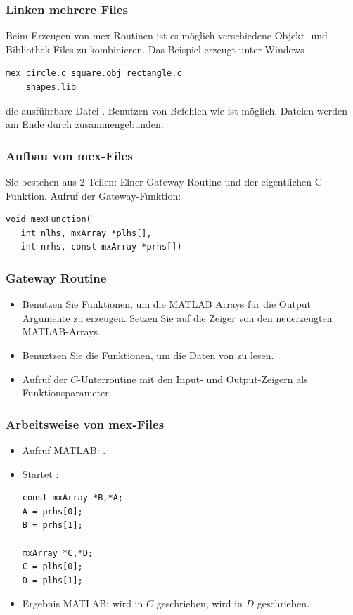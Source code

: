 %
\begin{frame}[fragile]\frametitle{Linken mehrere Files}
Beim Erzeugen von mex-Routinen ist es m\"oglich verschiedene Objekt- und
Bibliothek-Files zu kombinieren. Das Beispiel erzeugt unter Windows
\begin{lstlisting}
mex circle.c square.obj rectangle.c 
    shapes.lib
\end{lstlisting}
die ausf\"uhrbare Datei . Benutzen von Befehlen wie 
ist m\"oglich. Dateien werden am Ende durch  zusammengebunden. 
\end{frame}
%
%
\begin{frame}[fragile]\frametitle{Aufbau von mex-Files}
Sie bestehen aus 2 Teilen: Einer Gateway Routine und der eigentlichen
C-Funktion. Aufruf der Gateway-Funktion:
\begin{lstlisting}
void mexFunction(
   int nlhs, mxArray *plhs[],
   int nrhs, const mxArray *prhs[])
\end{lstlisting}

\end{frame}
%
%
\begin{frame}[fragile]\frametitle{Gateway Routine}

\begin{itemize}
\item Benutzen Sie   Funktionen, um die MATLAB Arrays f\"ur die Output
  Argumente zu erzeugen. Setzen Sie  auf die Zeiger von
  den neuerzeugten MATLAB-Arrays.
\item Benuztzen Sie die  Funktionen, um die Daten von
   zu lesen.
\item Aufruf der $C$-Unterroutine mit den Input- und Output-Zeigern als
  Funktionsparameter. 
\end{itemize}
\end{frame}
%
%
\begin{frame}[fragile]\frametitle{Arbeitsweise von mex-Files}
\begin{itemize}
\item Aufruf MATLAB: \alert{ }.
\item Startet :
\begin{lstlisting}
const mxArray *B,*A;
A = prhs[0];
B = prhs[1];

mxArray *C,*D;
C = plhs[0];
D = plhs[1];
\end{lstlisting} 
\item Ergebnis MATLAB:  wird in $C$ geschrieben, 
  wird in $D$ geschrieben. 
\end{itemize}
\end{frame}

